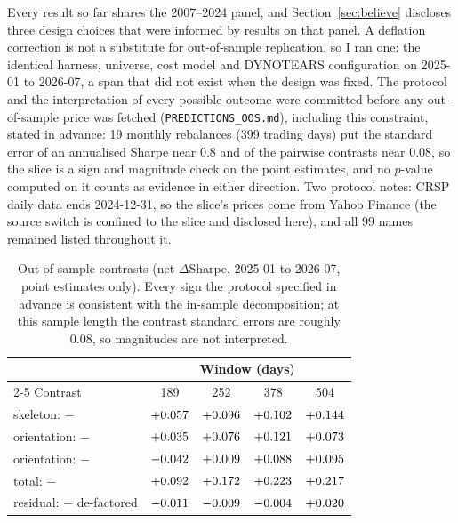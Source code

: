 Every result so far shares the 2007--2024 panel, and
Section~\ref{sec:believe} discloses three design choices that were
informed by results on that panel. A deflation correction is not a
substitute for out-of-sample replication, so I ran one: the identical
harness, universe, cost model and DYNOTEARS configuration on
2025-01 to 2026-07, a span that did not exist when the design was
fixed. The protocol and the interpretation of every possible outcome
were committed before any out-of-sample price was fetched
(\texttt{PREDICTIONS\_OOS.md}), including this constraint, stated in
advance: 19 monthly rebalances (399 trading days) put the standard
error of an annualised Sharpe near $0.8$ and of the pairwise contrasts
near $0.08$, so the slice is a sign and magnitude check on the
point estimates, and no $p$-value computed on it counts as evidence in
either direction. Two protocol notes: CRSP daily data ends 2024-12-31,
so the slice's prices come from Yahoo Finance (the source switch is
confined to the slice and disclosed here), and all 99 names remained
listed throughout it.

\begin{table}[t]
  \centering
  \caption{Out-of-sample contrasts (net $\Delta$Sharpe,
    2025-01 to 2026-07, point estimates only). Every sign the
    protocol specified in advance is consistent with the in-sample
    decomposition;
    at this sample length the contrast standard errors are roughly
    $0.08$, so magnitudes are not interpreted.}
  \label{tab:oos}
  \small
  \begin{tabular}{l c c c c}
    \toprule
    & \multicolumn{4}{c}{Window (days)} \\
    \cmidrule(lr){2-5}
    Contrast & 189 & 252 & 378 & 504 \\
    \midrule
    skeleton: \skelsamp{} $-$ \HRP{}          & $+0.057$ & $+0.096$ & $+0.102$ & $+0.144$ \\
    orientation: \skelsem{} $-$ \skelsamp{}   & $+0.035$ & $+0.076$ & $+0.121$ & $+0.073$ \\
    orientation: \orientsem{} $-$ \skelsamp{} & $-0.042$ & $+0.009$ & $+0.088$ & $+0.095$ \\
    total: \skelsem{} $-$ \HRP{}              & $+0.092$ & $+0.172$ & $+0.223$ & $+0.217$ \\
    residual: \skelsem{} $-$ de-factored      & $-0.011$ & $-0.009$ & $-0.004$ & $+0.020$ \\
    \bottomrule
  \end{tabular}
\end{table}


